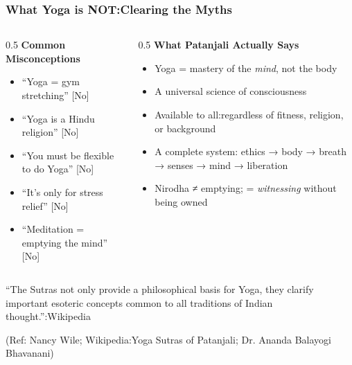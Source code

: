 \begin{frame}[fragile]\frametitle{What Yoga is NOT:Clearing the Myths}

\begin{columns}
\begin{column}[t]{0.5\linewidth}
\textbf{Common Misconceptions}
\begin{itemize}
\item ``Yoga = gym stretching'' [No]
\item ``Yoga is a Hindu religion'' [No]
\item ``You must be flexible to do Yoga'' [No]
\item ``It's only for stress relief'' [No]
\item ``Meditation = emptying the mind'' [No]
\end{itemize}
\end{column}
\begin{column}[t]{0.5\linewidth}
\textbf{What Patanjali Actually Says}
\begin{itemize}
\item Yoga = mastery of the \emph{mind}, not the body
\item A universal science of consciousness
\item Available to all:regardless of fitness, religion, or background
\item A complete system: ethics → body → breath → senses → mind → liberation
\item Nirodha ≠ emptying; = \emph{witnessing} without being owned
\end{itemize}
\end{column}
\end{columns}

\vspace{3mm}
\begin{center}
{\small ``The Sutras not only provide a philosophical basis for Yoga, they clarify important esoteric concepts common to all traditions of Indian thought.'':Wikipedia}
\end{center}

\tiny{(Ref: Nancy Wile; Wikipedia:Yoga Sutras of Patanjali; Dr. Ananda Balayogi Bhavanani)}

\end{frame}

